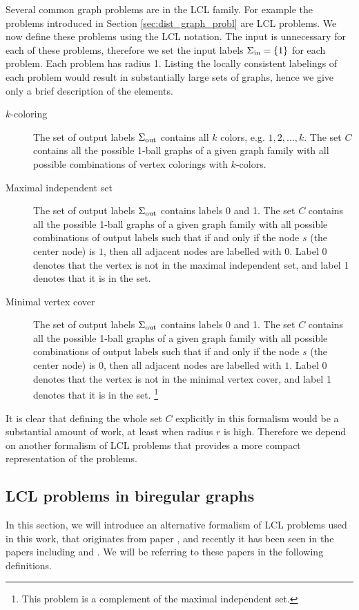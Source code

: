 Several common graph problems are in the LCL family.
For example the problems introduced in Section \ref{sec:dist_graph_probl} are LCL problems.
We now define these problems using the LCL notation.
The input is unnecessary for each of these problems,
therefore we set the input labels $\Sigma_{\text{in}} = \{1\}$ for each problem.
Each problem has radius 1.
Listing the locally consistent labelings of each problem would result in substantially large sets of graphs, hence we give only a brief description of the elements.
\begin{description}
  \item[$k$-coloring] The set of output labels $\Sigma_{\text{out}}$ contains all $k$ colors, e.g. $1, 2, \dotsc, k$.
  The set $C$ contains all the possible 1-ball graphs of a given graph family with all possible combinations of vertex colorings with $k$-colors.
  \item[Maximal independent set]
  The set of output labels $\Sigma_{\text{out}}$ contains labels 0 and 1.
  The set $C$ contains all the possible 1-ball graphs of a given graph family with all possible combinations of output labels such that if and only if the node $s$ (the center node) is $1$, then all adjacent nodes are labelled with $0$.
  Label 0 denotes that the vertex is not in the maximal independent set, and label 1 denotes that it is in the set.
  \item[Minimal vertex cover]
  The set of output labels $\Sigma_{\text{out}}$ contains labels 0 and 1.
  The set $C$ contains all the possible 1-ball graphs of a given graph family with all possible combinations of output labels such that if and only if the node $s$ (the center node) is $0$, then all adjacent nodes are labelled with $1$.
  Label 0 denotes that the vertex is not in the minimal vertex cover, and label 1 denotes that it is in the set.
  \footnote{This problem is a complement of the maximal independent set.}
\end{description}

It is clear that defining the whole set $C$ explicitly in this formalism would be a substantial amount of work, at least when radius $r$ is high.
Therefore we depend on another formalism of LCL problems that provides a more compact representation of the problems.


\subsection{LCL problems in biregular graphs} \label{sec:lcl_problems:biregular}
In this section, we will introduce an alternative formalism of LCL problems used in this work, that originates from paper \cite{DBLP:conf/podc/Brandt19}, and recently it has been seen in the papers including \cite{DBLP:conf/podc/Olivetti20} and \cite{DBLP:journals/sigact/Suomela20}.
We will be referring to these papers in the following definitions.


